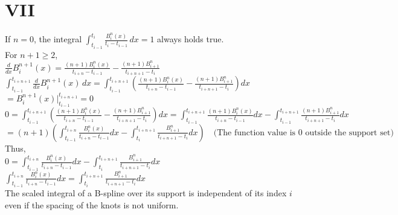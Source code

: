 \documentclass[a4paper]{article}
\begin{document}
\section*{VII}
If \( n = 0 \), the integral \( \int_{t_{i-1}}^{t_{i}} \frac{B_i^{n}(x)}{t_{i}-t_{i-1}} \, dx = 1 \) always holds true.\\

For \( n+1 \geq 2 \),\\
$\frac{d}{dx}B_i^{n+1}(x) = \frac{(n+1)B_i^{n}(x)}{t_{i+n}-t_{i-1}} - \frac{(n+1)B_{i+1}^{n}}{t_{i+n+1}-t_i}$\\
$\int_{t_{i-1}}^{t_{i+n+1}} \frac{d}{dx}B_i^{n+1}(x) \, dx = \int_{t_{i-1}}^{t_{i+n+1}} \left( \frac{(n+1)B_i^{n}(x)}{t_{i+n}-t_{i-1}} - \frac{(n+1)B_{i+1}^{n}}{t_{i+n+1}-t_i} \right) dx$\\
$= B_i^{n+1}(x) \Big|_{t_{i-1}}^{t_{i+n+1}} = 0$\\
$0 = \int_{t_{i-1}}^{t_{i+n+1}} \left( \frac{(n+1)B_i^{n}(x)}{t_{i+n}-t_{i-1}} - \frac{(n+1)B_{i+1}^{n}}{t_{i+n+1}-t_i} \right) dx = \int_{t_{i-1}}^{t_{i+n+1}} \frac{(n+1)B_i^{n}(x)}{t_{i+n}-t_{i-1}} dx - \int_{t_{i-1}}^{t_{i+n+1}} \frac{(n+1)B_{i+1}^{n}}{t_{i+n+1}-t_i} dx$\\
$= (n+1) \left( \int_{t_{i-1}}^{t_{i+n}} \frac{B_i^{n}(x)}{t_{i+n}-t_{i-1}} dx - \int_{t_{i}}^{t_{i+n+1}} \frac{B_{i+1}^{n}}{t_{i+n+1}-t_i} dx \right) \quad \text{(The function value is 0 outside the support set)}$\\
Thus,\\
$0 = \int_{t_{i-1}}^{t_{i+n}} \frac{B_i^{n}(x)}{t_{i+n}-t_{i-1}} dx - \int_{t_{i}}^{t_{i+n+1}} \frac{B_{i+1}^{n}}{t_{i+n+1}-t_i} dx$\\
$\int_{t_{i-1}}^{t_{i+n}} \frac{B_i^{n}(x)}{t_{i+n}-t_{i-1}} dx = \int_{t_{i}}^{t_{i+n+1}} \frac{B_{i+1}^{n}}{t_{i+n+1}-t_i} dx$\\
The scaled integral of a B-spline over its support is independent of its index \( i \) even if the spacing of the knots is not uniform.\\
\end{document}
